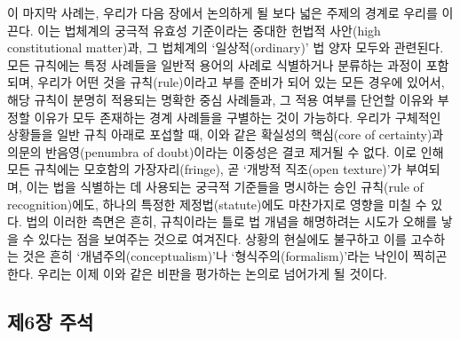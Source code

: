 이 마지막 사례는, 우리가 다음 장에서 논의하게 될 보다 넓은 주제의 경계로
우리를 이끈다. 이는 법체계의 궁극적 유효성 기준이라는 중대한 헌법적
사안(high constitutional matter)과, 그 법체계의 ‘일상적(ordinary)’ 법
양자 모두와 관련된다. 모든 규칙에는 특정 사례들을 일반적 용어의 사례로
식별하거나 분류하는 과정이 포함되며, 우리가 어떤 것을 규칙(rule)이라고
부를 준비가 되어 있는 모든 경우에 있어서, 해당 규칙이 분명히 적용되는
명확한 중심 사례들과, 그 적용 여부를 단언할 이유와 부정할 이유가 모두
존재하는 경계 사례들을 구별하는 것이 가능하다. 우리가 구체적인 상황들을
일반 규칙 아래로 포섭할 때, 이와 같은 확실성의 핵심(core of certainty)과
의문의 반음영(penumbra of doubt)이라는 이중성은 결코 제거될 수 없다.
이로 인해 모든 규칙에는 모호함의 가장자리(fringe), 곧 ‘개방적 직조(open
texture)’가 부여되며, 이는 법을 식별하는 데 사용되는 궁극적 기준들을
명시하는 승인 규칙(rule of recognition)에도, 하나의 특정한
제정법(statute)에도 마찬가지로 영향을 미칠 수 있다. 법의 이러한 측면은
흔히, 규칙이라는 틀로 법 개념을 해명하려는 시도가 오해를 낳을 수 있다는
점을 보여주는 것으로 여겨진다. 상황의 현실에도 불구하고 이를 고수하는
것은 흔히 ‘개념주의(conceptualism)’나 ‘형식주의(formalism)’라는 낙인이
찍히곤 한다. 우리는 이제 이와 같은 비판을 평가하는 논의로 넘어가게 될
것이다.

\newpage

\subsection{제6장 주석}\label{uxc81c6uxc7a5-uxc8fcuxc11d}


